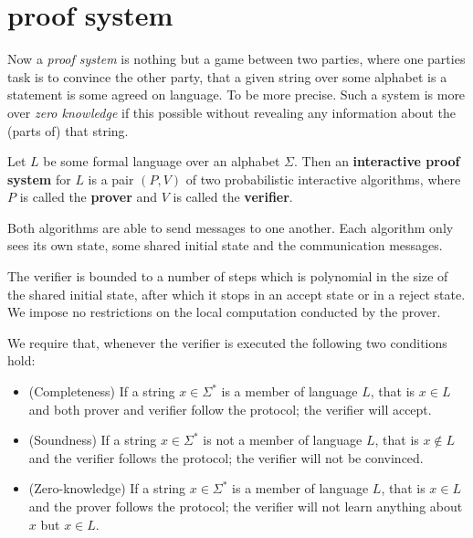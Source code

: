 \section{proof system}
Now a \textit{proof system} is nothing but a game between two parties, where one parties task is to convince the other party, that a given string over some alphabet is a statement is some agreed on language. To be more precise. Such a system is more over \textit{zero knowledge} if this possible without revealing any information about the (parts of) that string.
\begin{definition}
Let $L$ be some formal language over an alphabet $\Sigma$. Then an \textbf{interactive proof system} for $L$ is a pair $(P,V)$ of two probabilistic interactive algorithms, where $P$ is called the \textbf{prover} and $V$ is called the \textbf{verifier}. 

Both algorithms are able to send messages to one another. Each algorithm only sees its own state, some shared initial state and the communication messages. 

The verifier is bounded to a number of steps which is polynomial in the size of the shared initial state, after which it stops in an accept state or in a reject state. We impose no restrictions on the local computation conducted by the prover. 

We require that, whenever the verifier is executed the following two conditions hold:
\begin{itemize}
\item (Completeness) If a string $x\in \Sigma^*$ is a member of language $L$, that is $x\in L$ and both prover and verifier follow the protocol; the verifier will accept.
\item (Soundness) If a string $x\in \Sigma^*$ is not a member of language $L$, that is $x\notin L$ and the verifier follows the protocol; the verifier will not be convinced.
\item (Zero-knowledge) If a string $x\in \Sigma^*$ is a member of language $L$, that is $x\in L$ and the prover follows the protocol; the verifier will not learn anything about $x$ but $x\in L$.
\end{itemize}
\end{definition}

